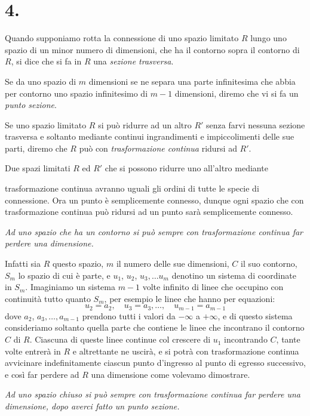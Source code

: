 \documentclass{article}
\begin{document}
\section*{4.}

Quando supponiamo rotta la connessione di uno spazio limitato $R$ lungo uno spazio di un minor numero di dimensioni, che ha il contorno sopra il contorno di $R$, si dice che si fa in $R$ una \emph{sezione trasversa}.

Se da uno spazio di $m$ dimensioni se ne separa una parte infinitesima che abbia per contorno uno spazio infinitesimo di $m-1$ dimensioni, diremo che vi si fa un \emph{punto sezione}.

Se uno spazio limitato $R$ si può ridurre ad un altro $R'$ senza farvi nessuna sezione trasversa e soltanto mediante continui ingrandimenti e impiccolimenti delle sue parti, diremo che $R$ può con \emph{trasformazione continua} ridursi ad $R'$.

Due spazi limitati $R$ ed $R'$ che si possono ridurre uno all'altro mediante

trasformazione continua avranno uguali gli ordini di tutte le specie di connessione. Ora un punto è semplicemente connesso, dunque ogni spazio che con trasformazione continua può ridursi ad un punto sarà semplicemente connesso.

\emph{Ad uno spazio che ha un contorno si può sempre con trasformazione continua far perdere una dimensione.}

Infatti sia $R$ questo spazio, $m$ il numero delle sue dimensioni, $C$ il suo contorno, $S_{m}$ lo spazio di cui è parte, e $u_{1}$, $u_{2}$, $u_{3},\ldots u_{m}$ denotino un sistema di coordinate in $S_{m}$. Imaginiamo un sistema $m-1$ volte infinito di linee che occupino con continuità tutto quanto $S_{m}$, per esempio le linee che hanno per equazioni:
\[ u_{2} = a_{2}, \quad u_{3} = a_{3},\ldots, \quad u_{m-1} = a_{m-1} \]
dove $a_{2}$, $a_{3},\ldots, a_{m-1}$ prendono tutti i valori da $-\infty$ a $+\infty$, e di questo sistema consideriamo soltanto quella parte che contiene le linee che incontrano il contorno $C$ di $R$. Ciascuna di queste linee continue col crescere di $u_{1}$ incontrando $C$, tante volte entrerà in $R$ e altrettante ne uscirà, e si potrà con trasformazione continua avvicinare indefinitamente ciascun punto d'ingresso al punto di egresso successivo, e così far perdere ad $R$ una dimensione come volevamo dimostrare.

\emph{Ad uno spazio chiuso si può sempre con trasformazione continua far perdere una dimensione, dopo averci fatto un punto sezione.}
\end{document}
